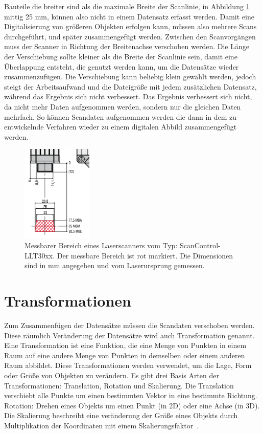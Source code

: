 Bauteile die breiter sind als die maximale Breite der Scanlinie, in Abbildung 
\ref{fig:scanner} mittig 25 mm, können also nicht in einem Datensatz erfasst werden. 
Damit eine Digitalisierung von größeren Objekten erfolgen kann, müssen
also mehrere Scans durchgeführt, und später zusammengefügt werden. Zwischen den 
Scanvorgängen muss der Scanner in Richtung der Breitenachse verschoben werden.
Die Länge der Verschiebung sollte kleiner als die Breite der Scanlinie sein, 
damit eine Überlappung entsteht, die 
genutzt werden kann, um die Datensätze wieder zusammenzufügen. Die Verschiebung kann 
beliebig klein gewählt werden, jedoch steigt der Arbeitsaufwand und die Dateigröße mit 
jedem zusätzlichen Datensatz, während das Ergebnis sich nicht verbessert.
Das Ergebnis verbessert sich nicht, da nicht mehr Daten aufgenommen werden, sondern nur 
die gleichen Daten mehrfach.
So können Scandaten aufgenommen werden die dann in dem zu entwickelnde Verfahren
wieder zu einem digitalen Abbild zusammengefügt werden.

\begin{figure}[h]
    \centering
    \includegraphics[width=0.3\textwidth]{images/Scanner.PNG}
    \caption{Messbarer Bereich eines Laserscanners vom Typ: ScanControl-LLT30xx.
    Der messbare Bereich ist rot markiert. Die Dimensionen sind in mm angegeben 
    und vom Laserursprung gemessen.}
    \label{fig:scanner}
\end{figure}

\section{Transformationen} \label{Transformation}

Zum Zusammenfügen der Datensätze müssen die Scandaten verschoben werden. 
Diese räumlich Veränderung der Datensätze wird auch Transformation genannt.
Eine Transformation ist eine Funktion, die eine Menge von Punkten in einem
Raum auf eine andere Menge von Punkten in demselben oder einem anderen Raum abbildet. 
Diese Transformationen werden verwendet, um die Lage, Form oder Größe von 
Objekten zu verändern.
Es gibt drei Basis Arten der Transformationen:
Translation, Rotation und Skalierung. Die Translation verschiebt alle Punkte 
um einen bestimmten Vektor in eine bestimmte Richtung. 
Rotation: Drehen eines Objekts um einen Punkt (in 2D) oder eine Achse (in 3D).
Die Skalierung beschreibt eine veränderung der Größe eines Objekts durch Multiplikation der Koordinaten 
mit einem Skalierungsfaktor~\cite{XiaoleiDu.2009}.


